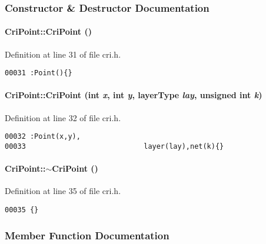 \subsubsection{Constructor \& Destructor Documentation}
\label{CriPoint_a0}
\paragraph{\setlength{\rightskip}{0pt plus 5cm}Cri\-Point::Cri\-Point ()}\hfill



Definition at line 31 of file cri.h.\small\begin{verbatim}00031 :Point(){}
\end{verbatim}\normalsize 
\label{CriPoint_a1}
\paragraph{\setlength{\rightskip}{0pt plus 5cm}Cri\-Point::Cri\-Point (int {\em x}, int {\em y}, {\bf layer\-Type} {\em lay}, unsigned int {\em k})}\hfill



Definition at line 32 of file cri.h.\small\begin{verbatim}00032 :Point(x,y),
00033                            layer(lay),net(k){}
\end{verbatim}\normalsize 
\label{CriPoint_a2}
\paragraph{\setlength{\rightskip}{0pt plus 5cm}Cri\-Point::$\sim$Cri\-Point ()\hspace{0.3cm}{\tt  [inline]}}\hfill



Definition at line 35 of file cri.h.\small\begin{verbatim}00035 {}
\end{verbatim}\normalsize 


\subsubsection{Member Function Documentation}
\label{CriPoint_a6}
